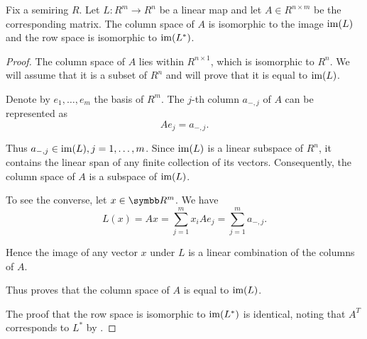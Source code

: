 \begin{proposition}\label{thm:column_and_row_spaces_are_images}
  Fix a semiring \( R \). Let \( L: R^m \to R^n \) be a linear map and let \( A \in R^{n \times m} \) be the corresponding matrix. The column space of \( A \) is isomorphic to the image \( \operatorname{im}(L) \) and the row space is isomorphic to \( \operatorname{im}(L^*) \).
\end{proposition}
\begin{proof}
  The column space of \( A \) lies within \( R^{n \times 1} \), which is isomorphic to \( R^n \). We will assume that it is a subset of \( R^n \) and will prove that it is equal to \( \operatorname{im}(L) \).

  Denote by \( e_1, \ldots, e_m \) the basis of \( R^m \). The \( j \)-th column \( a_{-,j} \) of \( A \) can be represented as
  \begin{equation*}
    A e_j = a_{-,j}.
  \end{equation*}

  Thus \( a_{-,j} \in \operatorname{im}(L), j = 1, \ldots, m \). Since \( \operatorname{im}(L) \) is a linear subspace of \( R^n \), it contains the linear span of any finite collection of its vectors. Consequently, the column space of \( A \) is a subspace of \( \operatorname{im}(L) \).

  To see the converse, let \( x \in \BR^m \). We have
  \begin{equation*}
    L(x) = Ax = \sum_{j=1}^m x_i A e_j = \sum_{j=1}^m a_{-,j}.
  \end{equation*}

  Hence the image of any vector \( x \) under \( L \) is a linear combination of the columns of \( A \).

  Thus proves that the column space of \( A \) is equal to \( \operatorname{im}(L) \).

  The proof that the row space is isomorphic to \( \operatorname{im}(L^*) \) is identical, noting that \( A^T \) corresponds to \( L^* \) by .
\end{proof}

